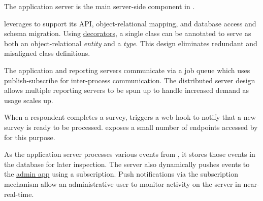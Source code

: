 \documentclass{article}
\begin{document}
The application server is the main server-side component in \caper.

\caper{} leverages \nest{}
to support its
\gql{} API,
\typeorm{} object-relational mapping, and
\pg{} database access and schema migration.
Using \ts{}
\href{https://www.typescriptlang.org/docs/handbook/decorators.html}{decorators},
a single class
can be annotated to serve as both
an object-relational \emph{entity}
and a \gql{} \emph{type}.
This design eliminates redundant and misaligned class definitions.

The application and reporting servers
communicate via a \bull{} job queue
which uses \redis{} publish-subscribe
for inter-process communication.
The distributed server design allows multiple reporting servers to be spun up
to handle increased demand as usage scales up.

When a respondent completes a survey,
\qual{} triggers a web hook
to notify \caper{} that a new survey
is ready to be processed.
\caper{}
exposes a small number of \rest{} endpoints
accessed by \qual{} for this purpose.

As the application server processes various events from \qual,
it stores those events in the database for later inspection.
The server also dynamically pushes events to the
\hyperref[sec:admin-app]{admin app}
using a \gql{} subscription.
Push notifications via the subscription mechanism
allow an administrative user
to monitor activity on the \caper{} server
in near-real-time.
\end{document}
